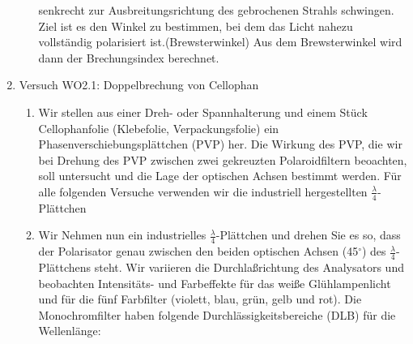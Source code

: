 \documentclass[12pt]{scrartcl}
\begin{document}
\begin{enumerate}
\begin{enumerate}
senkrecht zur Ausbreitungsrichtung des gebrochenen Strahls schwingen.
Ziel ist es den Winkel zu bestimmen, bei dem das Licht nahezu vollständig polarisiert ist.(Brewsterwinkel)
Aus dem Brewsterwinkel wird dann %
der Brechungsindex berechnet.
\end{enumerate}
\item Versuch WO2.1: Doppelbrechung von Cellophan\\
\begin{enumerate}
\item
Wir stellen aus einer Dreh- oder Spannhalterung und einem Stück Cellophanfolie (Klebefolie, Verpackungsfolie) ein Phasenverschiebungsplättchen (PVP) her. %
Die Wirkung des PVP, die wir bei Drehung des PVP zwischen zwei gekreuzten Polaroidfiltern beoachten, soll untersucht und die Lage der optischen Achsen bestimmt werden.
Für alle folgenden Versuche verwenden wir die industriell hergestellten $\frac{\lambda}{4}$-Plättchen 
\item Wir Nehmen nun ein industrielles
$\frac{\lambda}{4}$-Plättchen und drehen Sie es so, dass der Polarisator genau zwischen den beiden optischen Achsen (45$^\circ$) des $\frac{\lambda}{4}$-Plättchens steht.
Wir variieren die Durchlaßrichtung des Analysators und beobachten Intensitäts- und Farbeffekte für das weiße Glühlampenlicht und für die fünf
Farbfilter (violett, blau, grün, gelb und rot). Die Monochromfilter 
haben folgende Durchlässigkeitsbereiche (DLB) für die Wellenlänge:


\end{enumerate}
\end{enumerate}
\end{document}
